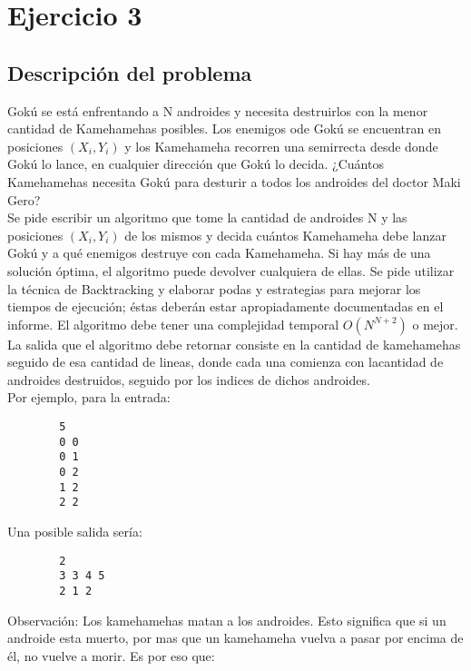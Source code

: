 \section{Ejercicio 3}
    \subsection{Descripción del problema}

        Gokú se está enfrentando a N androides y necesita destruirlos con la menor cantidad de Kamehamehas posibles. Los enemigos ode Gokú se encuentran en posiciones $(X_i , Y_i)$ y los Kamehameha recorren una semirrecta desde donde Gokú lo lance, en cualquier dirección que Gokú lo decida. ¿Cuántos Kamehamehas necesita Gokú para desturir a todos los androides del doctor Maki Gero? \\

        Se pide escribir un algoritmo que tome la cantidad de androides N y las posiciones $(X_i , Y_i)$ de los mismos y decida cuántos Kamehameha debe lanzar Gokú y a qué enemigos destruye con cada Kamehameha. Si hay más de una solución óptima, el algoritmo puede devolver cualquiera de ellas. Se pide utilizar la técnica de Backtracking y elaborar podas y estrategias para mejorar los tiempos de ejecución; éstas deberán estar apropiadamente documentadas en el informe. El algoritmo debe tener una complejidad temporal $O(N^{N+2})$ o mejor. \\

        La salida que el algoritmo debe retornar consiste en la cantidad de kamehamehas seguido de esa cantidad de lineas, donde cada una comienza con lacantidad de androides destruidos, seguido por los indices de dichos androides. \\

        Por ejemplo, para la entrada:
        
        \begin{verbatim}
        5
        0 0
        0 1
        0 2
        1 2
        2 2
        \end{verbatim}
        Una posible salida sería:

        \begin{verbatim}
        2
        3 3 4 5
        2 1 2
        \end{verbatim}

        Observación: Los kamehamehas matan a los androides. Esto significa que si un androide esta muerto, por mas que un kamehameha vuelva a pasar por encima de él, no vuelve a morir. Es por eso que:

